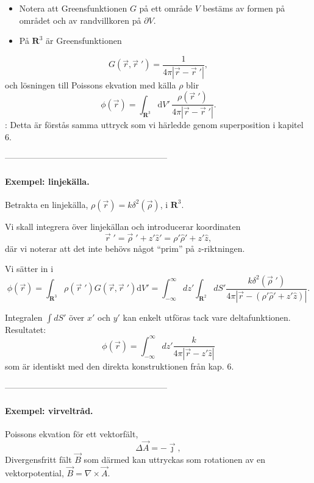 \documentclass[%
oneside,                 %
final,                   %
10pt]{article}
\newcommand{\shortinlinecomment}[3]{{\color{red}{\bf #1}: #2}}
\begin{document}
\begin{itemize}
\item Notera att Greensfunktionen $G$ på ett område $V$ bestäms av formen på området och av randvillkoren på $\partial V$.

\item På $\mathbf{R}^3$ är Greensfunktionen
\end{itemize}

\noindent
$$
G(\vec{r},\vec{r}{\;}')=\frac{1}{4\pi|\vec{r}-\vec{r}{\;}'|},
$$
och lösningen till Poissons ekvation med källa $\rho$ blir
$$
\phi(\vec{r})=\int_{\mathbf{R}^3}\mbox{d}V'\,\frac{\rho(\vec{r}{\;}')}{4\pi|\vec{r}-\vec{r}{\;}'|}.
$$
\shortinlinecomment{Comment 2}{ Detta är förstås samma uttryck som vi härledde genom superposition i kapitel 6. }{ Detta är förstås samma }

---------------------------------------------------------
\paragraph{Exempel: linjekälla.}


\vspace{3mm}


Betrakta en linjekälla, $\rho(\vec{r})=k\delta^2(\vec{\rho})$, i $\mathbf{R}^3$.

Vi skall integrera över linjekällan och introducerar koordinaten
$$
\vec{r}{\;}' = \vec{\rho}{\;}' + z' \hat{z}' = \rho' \hat{\rho}' + z' \hat{z},
$$
där vi noterar att det inte behövs något ``prim'' på $z$-riktningen.

Vi sätter in i 
$$
\phi(\vec{r}) = \int_{\mathbf{R}^3}\rho(\vec{r}{\;}')G(\vec{r},\vec{r}{\;}')\mbox{d}V'
=\int_{-\infty}^{\infty}dz'\int_{\mathbf{R}^2}dS'
       \frac{k\delta^2(\vec{\rho}{\;}')}{4\pi|\vec{r}-(\rho'\hat\rho{}'+z'\hat z)|} .
$$

Integralen $\int dS'$ över $x'$ och $y'$ kan enkelt utföras tack vare deltafunktionen. Resultatet:
$$
\phi(\vec{r})=\int_{-\infty}^{\infty}dz' \frac{k}{4\pi|\vec{r}-z'\hat z|}
$$  
som är identiskt med den direkta konstruktionen från kap. 6.

---------------------------------------------------------
\paragraph{Exempel: virveltråd.}


\vspace{3mm}


Poissons ekvation för ett vektorfält,
$$
\Delta\vec A = -\vec\jmath, 
$$
Divergensfritt fält $\vec B$ som därmed kan uttryckas som rotationen av en
vektorpotential, $\vec B=\nabla\times\vec A$. 
\end{document}
